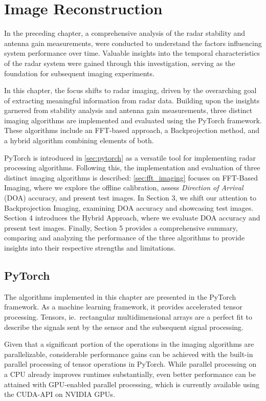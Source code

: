 \chapter{Image Reconstruction}

In the preceding chapter, a comprehensive analysis of the radar stability and antenna gain measurements,
were conducted to understand the factors influencing system performance over time.
Valuable insights into the temporal characteristics of the radar system were gained through this investigation,
serving as the foundation for subsequent imaging experiments.

In this chapter, the focus shifts to radar imaging,
driven by the overarching goal of extracting meaningful information from radar data.
Building upon the insights garnered from stability analysis and antenna gain measurements,
three distinct imaging algorithms are implemented and evaluated using the PyTorch framework.
These algorithms include an FFT-based approach, a Backprojection method, and a hybrid algorithm combining elements of both.

PyTorch is introduced in \autoref{sec:pytorch} as a versatile tool for implementing radar processing algorithms.
Following this, the implementation and evaluation of three distinct imaging algorithms is described: 
\autoref{sec:fft_imaging} focuses on FFT-Based Imaging, where we explore the offline calibration,
assess \emph{Direction of Arrival} (DOA) accuracy,
and present test images. In Section 3, we shift our attention to Backprojection Imaging,
examining DOA accuracy and showcasing test images. Section 4 introduces the Hybrid Approach, 
where we evaluate DOA accuracy and present test images. 
Finally, Section 5 provides a comprehensive summary, 
comparing and analyzing the performance of the three algorithms to provide insights into their respective strengths and limitations.

\section{PyTorch}
\label{sec:pytorch}
The algorithms implemented in this chapter are presented in the PyTorch framework.
As a machine learning framework, it provides accelerated tensor processing.
Tensors, ie.\ rectangular multidimensional arrays are a perfect fit to
describe the signals sent by the sensor and the subsequent signal processing.

Given that a significant portion of the operations in the imaging algorithms are parallelizable,
considerable performance gains can be achieved with the built-in parallel processing of tensor operations in PyTorch. 
While parallel processing on a CPU already improves runtimes substantially, 
even better performance can be attained with GPU-enabled parallel processing, 
which is currently available using the CUDA-API on NVIDIA GPUs.

